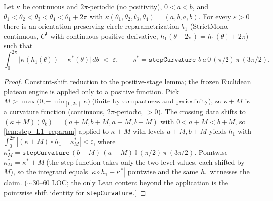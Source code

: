 \begin{lemma}
  \label{lem:step_L1_reparam_relaxed}
  Let $\kappa$ be continuous and $2\pi$-periodic (no positivity), $0<a<b$, and
  $\theta_1<\theta_2<\theta_3<\theta_4<\theta_1+2\pi$ with
  $\kappa(\theta_1,\theta_2,\theta_3,\theta_4)=(a,b,a,b)$. For every
  $\varepsilon>0$ there is an orientation-preserving circle reparametrization
  $h_1$ ($\mathrm{StrictMono}$, continuous, $C^1$ with continuous positive
  derivative, $h_1(\theta+2\pi)=h_1(\theta)+2\pi$) such that
  \[
    \int_0^{2\pi}\bigl|\kappa(h_1(\theta))-\kappa^\ast(\theta)\bigr|\,d\theta
    \;<\;\varepsilon,
    \qquad \kappa^\ast=\texttt{stepCurvature } b\,a\,0\,(\pi/2)\,\pi\,(3\pi/2).
  \]
\end{lemma}

\begin{proof}
  \leanok
  Constant-shift reduction to the positive-stage lemma; the frozen Euclidean
  plateau engine is applied only to a positive function. Pick
  $M>\max\bigl(0,-\min_{[0,2\pi]}\kappa\bigr)$ (finite by compactness and
  periodicity), so $\kappa+M$ is a curvature function
  (continuous, $2\pi$-periodic, $>0$). The crossing data shifts to
  $(\kappa+M)(\theta_k)=(a+M,b+M,a+M,b+M)$ with $0<a+M<b+M$, so
  \cref{lem:step_L1_reparam} applied to $\kappa+M$ with levels $a+M,b+M$
  yields $h_1$ with
  $\int_0^{2\pi}|(\kappa+M)\circ h_1-\kappa^\ast_M|<\varepsilon$, where
  $\kappa^\ast_M=\texttt{stepCurvature}\,(b+M)\,(a+M)\,0\,(\pi/2)\,\pi\,
  (3\pi/2)$. Pointwise $\kappa^\ast_M=\kappa^\ast+M$ (the step function takes
  only the two level values, each shifted by $M$), so the integrand equals
  $|\kappa\circ h_1-\kappa^\ast|$ pointwise and the same $h_1$ witnesses the
  claim. ($\sim$30--60 LOC; the only Lean content beyond the application is
  the pointwise shift identity for \texttt{stepCurvature}.)
\end{proof}

